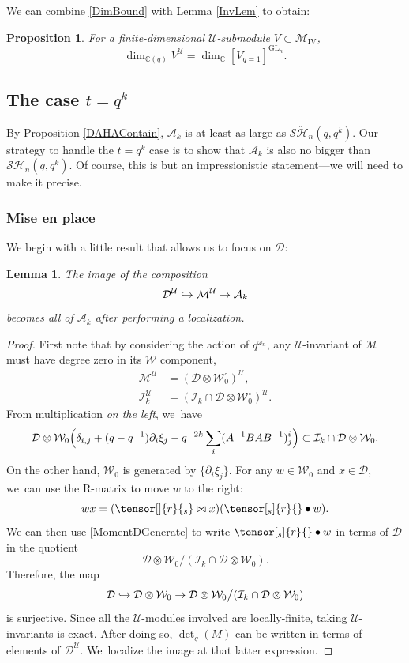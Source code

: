\documentclass[JEP,XML,SOM,Unicode,published]{cedram}
\newcommand\hto{\mathrel{\lhook\joinrel\to}}
\newcommand{\GL}{\mathrm{GL}}
\newtheorem{prop}[thm]{Proposition}
\newtheorem{lem}[thm]{Lemma}
\theoremstyle{definition}
\newcommand{\CC}{\mathbb{C}}
\newcommand{\UU}{\mathcal{U}}
\newcommand{\DD}{\mathcal{D}}
\newcommand{\WW}{\mathcal{W}}
\newcommand{\AAA}{\mathcal{A}}
\newcommand{\MM}{\mathcal{M}}
\newcommand{\SHH}{\mathcal{S}\ddot{\mathcal{H}}}
\newcommand{\del}{\partial}
\begin{document}
We can combine \eqref{DimBound} with Lemma \ref{InvLem} to obtain:
\begin{prop}\label{DInvProp}
For a finite-dimensional $\UU$-submodule $V\subset\MM_{\mathrm{IV}}$,
\begin{equation}
\dim_{\CC(q)} V^\UU = \dim_\CC[ V_{q=1}]^{\GL_n}.
\label{InvBound}
\end{equation}
\end{prop}

\subsection{The case $t=q^k$}\label{qkCase}
By Proposition \ref{DAHAContain}, $\AAA_k$ is at least as large as $\SHH_n(q,q^k)$.
Our strategy to handle the $t=q^k$ case is to show that $\AAA_k$ is also no bigger than $\SHH_n(q,q^k)$.
Of course, this is but an impressionistic statement---we will need to make it precise.

\subsubsection{Mise en place}
We begin with a little result that allows us to focus on $\DD$:

\begin{lem}\label{DGenerate}
The image of the composition
\[
\DD^\UU\hto\MM^\UU\to\AAA_k
\]
becomes all of $\AAA_k$ after performing a localization.
\end{lem}

\begin{proof}
First note that by considering the action of $q^{\omega_n}$, any $\UU$-invariant of $\MM$ must have degree zero in its $\WW$ component, \ie
\begin{align*}
\MM^\UU&=\left(\DD\otimes\WW_0^\circ \right)^\UU,\\
\mathcal{I}_k^\UU&= \left(\mathcal{I}_k\cap\DD\otimes\WW_0^\circ \right)^\UU.
\end{align*}
From multiplication \textit{on the left}, we~have
\begin{equation}
\DD\otimes\WW_0\Bigl(\delta_{i,j}+(q-q^{-1})\del_i\xi_j -q^{-2k}\sum_i(A^{-1}BAB^{-1})_j^i\Bigr)\subset\mathcal{I}_k\cap\DD\otimes\WW_0.
\label{MomentDGenerate}
\end{equation}
On the other hand, $\WW_0$ is generated by $\{\del_i\xi_j\}$.
For any $w\in\WW_0$ and $x\in\DD$, we~can use the R-matrix to move $w$ to the right:
\[
wx=(\tensor[]{r}{_s}\bowtie x)(\tensor[_s]{r}{}\bullet w).
\]
We can then use \eqref{MomentDGenerate} to write $\tensor[_s]{r}{}\bullet w$ in terms of $\DD$ in the quotient
\[
\DD\otimes\WW_0\big/(\mathcal{I}_k\cap\DD\otimes\WW_0).
\]
Therefore, the map
\[
\DD\hto\DD\otimes\WW_0\to\DD\otimes\WW_0\big/(\mathcal{I}_k\cap\DD\otimes\WW_0)
\]
is surjective.
Since all the $\UU$-modules involved are locally-finite, taking $\UU$-invariants is exact.
After doing so, $\det_q(M)$ can be written in terms of elements of $\DD^\UU$. We~localize the image at that latter expression.
\end{proof}
\end{document}
